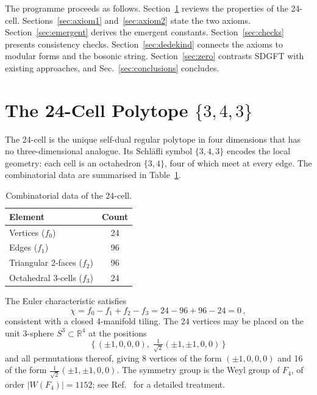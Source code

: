 \documentclass[amsmath,amssymb,aps,prd,twocolumn,superscriptaddress,nofootinbib]{revtex4-2}
\begin{document}
The programme proceeds as follows.  Section~\ref{sec:24cell} reviews the
properties of the 24-cell.  Sections~\ref{sec:axiom1} and~\ref{sec:axiom2}
state the two axioms.  Section~\ref{sec:emergent} derives the emergent
constants.  Section~\ref{sec:checks} presents consistency checks.
Section~\ref{sec:dedekind} connects the axioms to modular forms and the bosonic
string.  Section~\ref{sec:zero} contrasts SDGFT with existing approaches, and
Sec.~\ref{sec:conclusions} concludes.

\section{The 24-Cell Polytope \texorpdfstring{$\{3,4,3\}$}{}}\label{sec:24cell}

The 24-cell is the unique self-dual regular polytope in four dimensions that has
no three-dimensional analogue.  Its Schl\"afli symbol $\{3,4,3\}$ encodes the
local geometry: each cell is an octahedron $\{3,4\}$, four of which meet at
every edge.  The combinatorial data are summarised in Table~\ref{tab:24cell}.

\begin{table}[H]
\centering
\caption{Combinatorial data of the 24-cell.}\label{tab:24cell}
\begin{tabular}{@{}lc@{}}
\toprule
Element & Count \\
\midrule
Vertices ($f_0$) & 24 \\
Edges ($f_1$) & 96 \\
Triangular 2-faces ($f_2$) & 96 \\
Octahedral 3-cells ($f_3$) & 24 \\
\bottomrule
\end{tabular}
\end{table}

The Euler characteristic satisfies
\begin{equation}\label{eq:euler}
  \chi = f_0 - f_1 + f_2 - f_3 = 24 - 96 + 96 - 24 = 0\,,
\end{equation}
consistent with a closed 4-manifold tiling.  The 24 vertices may be placed on
the unit 3-sphere $S^3 \subset \mathbb{R}^4$ at the positions
\begin{equation}\label{eq:verts}
  \bigl\{\,(\pm1,0,0,0),\;
  \tfrac{1}{\sqrt{2}}(\pm1,\pm1,0,0)\,\bigr\}
\end{equation}
and all permutations thereof, giving 8 vertices of the form $(\pm1,0,0,0)$ and
16 of the form $\tfrac{1}{\sqrt{2}}(\pm1,\pm1,0,0)$.  The symmetry group is
the Weyl group of $F_4$, of order $|W(F_4)| = 1152$; see
Ref.~\cite{Besemer2026_02} for a detailed treatment.
\end{document}
